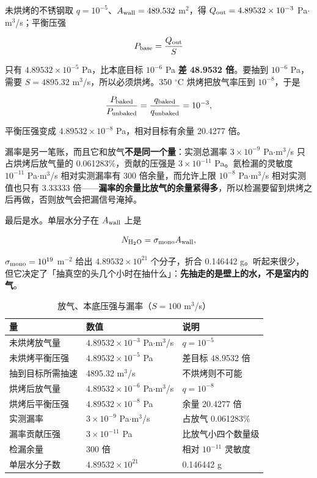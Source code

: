 未烘烤的不锈钢取 $q=10^{-5}$、$A_{\rm wall}=489.532$ m$^2$，得 $Q_{\rm out}=4.89532\times10^{-3}$ Pa$\cdot$m$^3$/s；平衡压强

\begin{equation}
P_{\rm base}=\frac{Q_{\rm out}}{S}
\label{eq:app-ao-base}
\end{equation}

只有 $4.89532\times10^{-5}$ Pa，比本底目标 $10^{-6}$ Pa \textbf{差 48.9532 倍}。要抽到 $10^{-6}$ Pa，需要 $S=4895.32$ m$^3$/s，所以必须烘烤。350 $^\circ$C 烘烤把放气率压到 $10^{-8}$，于是

\begin{equation}
\frac{P_{\rm baked}}{P_{\rm unbaked}}=\frac{q_{\rm baked}}{q_{\rm unbaked}}=10^{-3},
\label{eq:app-ao-bake}
\end{equation}

平衡压强变成 $4.89532\times10^{-8}$ Pa，相对目标有余量 20.4277 倍。

漏率是另一笔账，而且它和放气\textbf{不是同一个量}：实测总漏率 $3\times10^{-9}$ Pa$\cdot$m$^3$/s 只占烘烤后放气量的 0.061283\%，贡献的压强是 $3\times10^{-11}$ Pa。氦检漏的灵敏度 $10^{-11}$ Pa$\cdot$m$^3$/s 相对实测漏率有 300 倍余量，而允许上限 $10^{-8}$ Pa$\cdot$m$^3$/s 相对实测值也只有 3.33333 倍——\textbf{漏率的余量比放气的余量紧得多}，所以检漏要留到烘烤之后再做，否则放气会把漏信号淹掉。

最后是水。单层水分子在 $A_{\rm wall}$ 上是

\begin{equation}
N_{\rm H_2O}=\sigma_{\rm mono}A_{\rm wall},
\label{eq:app-ao-monolayer}
\end{equation}

$\sigma_{\rm mono}=10^{19}$ m$^{-2}$ 给出 $4.89532\times10^{21}$ 个分子，折合 0.146442 g。听起来很少，但它决定了「抽真空的头几个小时在抽什么」：\textbf{先抽走的是壁上的水，不是室内的气}。

\begin{table}[htbp]
\centering
\caption{放气、本底压强与漏率（$S=100$ m$^3$/s）}
\label{tab:app-ao-outgas}
{\small
\begin{tabular}{p{5.0cm}p{3.6cm}p{6.0cm}}
\toprule
量 & 数值 & 说明 \\
\midrule
未烘烤放气量 & $4.89532\times10^{-3}$ Pa$\cdot$m$^3$/s & $q=10^{-5}$ \\
未烘烤平衡压强 & $4.89532\times10^{-5}$ Pa & 差目标 48.9532 倍 \\
抽到目标所需抽速 & 4895.32 m$^3$/s & 不烘烤则不可能 \\
烘烤后放气量 & $4.89532\times10^{-6}$ Pa$\cdot$m$^3$/s & $q=10^{-8}$ \\
烘烤后平衡压强 & $4.89532\times10^{-8}$ Pa & 余量 20.4277 倍 \\
实测漏率 & $3\times10^{-9}$ Pa$\cdot$m$^3$/s & 占放气 0.061283\% \\
漏率贡献压强 & $3\times10^{-11}$ Pa & 比放气小四个数量级 \\
检漏余量 & 300 倍 & 相对 $10^{-11}$ 灵敏度 \\
单层水分子数 & $4.89532\times10^{21}$ & 0.146442 g \\
\bottomrule
\end{tabular}}
\end{table}

